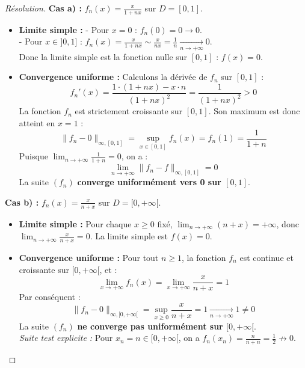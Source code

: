 \documentclass[12pt,a4paper]{report}
\begin{document}
\begin{proof}[Résolution]
\textbf{Cas a) :} $f_n(x) = \frac{x}{1+nx}$ sur $D = [0, 1]$.
\begin{itemize}
    \item \textbf{Limite simple :}
    - Pour $x = 0$ : $f_n(0) = 0 \to 0$.\\
    - Pour $x \in ]0, 1]$ : $f_n(x) = \frac{x}{1+nx} \sim \frac{x}{nx} = \frac{1}{n} \xrightarrow[n \to +\infty]{} 0$.\\
    Donc la limite simple est la fonction nulle sur $[0, 1]$ : $f(x) = 0$.
    \item \textbf{Convergence uniforme :}
    Calculons la dérivée de $f_n$ sur $[0, 1]$ :
    \[ f_n'(x) = \frac{1 \cdot (1+nx) - x \cdot n}{(1+nx)^2} = \frac{1}{(1+nx)^2} > 0 \]
    La fonction $f_n$ est strictement croissante sur $[0, 1]$. Son maximum est donc atteint en $x = 1$ :
    \[ \|f_n - 0\|_{\infty, [0, 1]} = \sup_{x \in [0, 1]} f_n(x) = f_n(1) = \frac{1}{1+n} \]
    Puisque $\lim_{n \to +\infty} \frac{1}{1+n} = 0$, on a :
    \[ \lim_{n \to +\infty} \|f_n - f\|_{\infty, [0, 1]} = 0 \]
    La suite $(f_n)$ \textbf{converge uniformément vers 0 sur $[0, 1]$}.
\end{itemize}

\textbf{Cas b) :} $f_n(x) = \frac{x}{n+x}$ sur $D = [0, +\infty[$.
\begin{itemize}
    \item \textbf{Limite simple :}
    Pour chaque $x \ge 0$ fixé, $\lim_{n \to +\infty} (n+x) = +\infty$, donc $\lim_{n \to +\infty} \frac{x}{n+x} = 0$.
    La limite simple est $f(x) = 0$.
    \item \textbf{Convergence uniforme :}
    Pour tout $n \ge 1$, la fonction $f_n$ est continue et croissante sur $[0, +\infty[$, et :
    \[ \lim_{x \to +\infty} f_n(x) = \lim_{x \to +\infty} \frac{x}{n+x} = 1 \]
    Par conséquent :
    \[ \|f_n - 0\|_{\infty, [0, +\infty[} = \sup_{x \ge 0} \frac{x}{n+x} = 1 \xrightarrow[n \to +\infty]{} 1 \neq 0 \]
    La suite $(f_n)$ \textbf{ne converge pas uniformément sur $[0, +\infty[$}.\\
    \textit{Suite test explicite :} Pour $x_n = n \in [0, +\infty[$, on a $f_n(x_n) = \frac{n}{n+n} = \frac{1}{2} \not\to 0$.
\end{itemize}


\end{proof}
\end{document}

